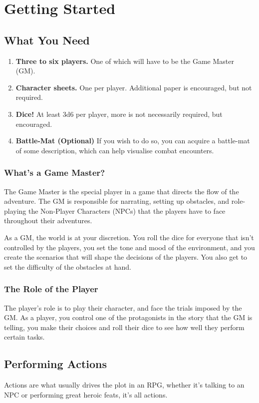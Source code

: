 \chapter{Getting Started}
\section{What You Need}
\begin{enumerate}
    \item \textbf{Three to six players.} One of which will have to be the Game Master (GM).
    \item \textbf{Character sheets.} One per player. 
    Additional paper is encouraged, but not required.
    \item \textbf{Dice!} At least 3d6 per player, more is not necessarily required, but encouraged.
    \item \textbf{Battle-Mat (Optional)} If you wish to do so, you can acquire a battle-mat of some description, which can help visualise combat encounters.
\end{enumerate}

\subsection{What's a Game Master?}
The Game Master is the special player in a game that directs the flow of the adventure.
The GM is responsible for narrating, setting up obstacles, and role-playing the Non-Player Characters (NPCs) that the players have to face throughout their adventures.

As a GM, the world is at your discretion. 
You roll the dice for everyone that isn't controlled by the players, you set the tone and mood of the environment, and you create the scenarios that will shape the decisions of the players.
You also get to set the difficulty of the obstacles at hand.

\subsection{The Role of the Player}
The player's role is to play their character, and face the trials imposed by the GM.
As a player, you control one of the protagonists in the story that the GM is telling, you make their choices and roll their dice to see how well they perform certain tasks.

\section{Performing Actions}
Actions are what usually drives the plot in an RPG, whether it's talking to an NPC or performing great heroic feats, it's all actions.


